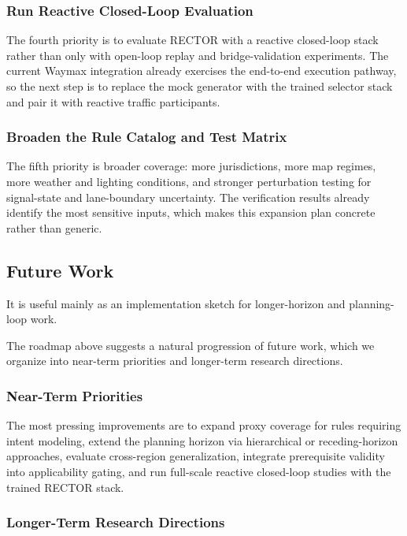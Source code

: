 \subsubsection{Run Reactive Closed-Loop Evaluation}
The fourth priority is to evaluate RECTOR with a reactive closed-loop stack rather than only with open-loop replay and bridge-validation experiments.  The current Waymax integration already exercises the end-to-end execution pathway, so the next step is to replace the mock generator with the trained selector stack and pair it with reactive traffic participants.

\subsubsection{Broaden the Rule Catalog and Test Matrix}
The fifth priority is broader coverage: more jurisdictions, more map regimes, more weather and lighting conditions, and stronger perturbation testing for signal-state and lane-boundary uncertainty.  The verification results already identify the most sensitive inputs, which makes this expansion plan concrete rather than generic.

\subsection{Future Work}
\label{subsec:future_work}

It is useful mainly as an implementation sketch for longer-horizon and planning-loop work.

The roadmap above suggests a natural progression of future work, which we organize into near-term priorities and longer-term research directions.

\subsubsection{Near-Term Priorities}

The most pressing improvements are to expand proxy coverage for rules requiring intent modeling, extend the planning horizon via hierarchical or receding-horizon approaches, evaluate cross-region generalization, integrate prerequisite validity into applicability gating, and run full-scale reactive closed-loop studies with the trained RECTOR stack.

\subsubsection{Longer-Term Research Directions}

